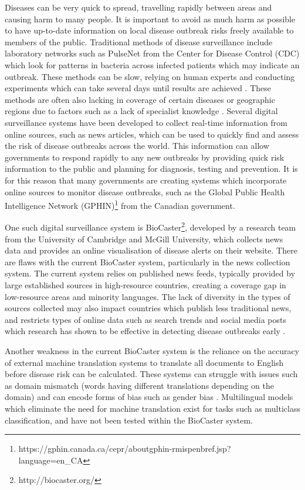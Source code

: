 \documentclass{l4proj}
\begin{document}
Diseases can be very quick to spread, travelling rapidly between areas and causing harm to many people. It is important to avoid as much harm as possible to have up-to-date information on local disease outbreak risks freely available to members of the public. Traditional methods of disease surveillance include laboratory networks such as PulseNet from the Center for Disease Control (CDC) which look for patterns in bacteria across infected patients which may indicate an outbreak. These methods can be slow, relying on human experts and conducting experiments which can take several days until results are achieved \citep{swaminathan2001pulsenet}. These methods are often also lacking in coverage of certain diseases or geographic regions due to factors such as a lack of specialist knowledge \citep{abdulraheem2004disease}. Several digital surveillance systems have been developed to collect real-time information from online sources, such as news articles, which can be used to quickly find and assess the risk of disease outbreaks across the world. This information can allow governments to respond rapidly to any new outbreaks by providing quick risk information to the public and planning for diagnosis, testing and prevention. It is for this reason that many governments are creating systems which incorporate online sources to monitor disease outbreaks, such as the Global Public Health Intelligence Network (GPHIN)\footnote{https://gphin.canada.ca/cepr/aboutgphin-rmispenbref.jsp?language=en_CA} from the Canadian government. \par

One such digital surveillance system is BioCaster\footnote{http://biocaster.org/}, developed by a research team from the University of Cambridge and McGill University, which collects news data and provides an online visualisation of disease alerts on their website. There are flaws with the current BioCaster system, particularly in the news collection system. The current system relies on published news feeds, typically provided by large established sources in high-resource countries, creating a coverage gap in low-resource areas and minority languages. The lack of diversity in the types of sources collected may also impact countries which publish less traditional news, and restricts types of online data such as search trends and social media posts which research has shown to be effective in detecting disease outbreaks early \cite{seo2017methods}. \par
Another weakness in the current BioCaster system is the reliance on the accuracy of external machine translation systems to translate all documents to English before disease risk can be calculated. These systems can struggle with issues such as domain mismatch (words having different translations depending on the domain) \citep{koehn2017six} and can encode forms of bias such as gender bias \citep{stanovsky2019evaluating}. Multilingual models which eliminate the need for machine translation exist for tasks such as multiclass classification, and have not been tested within the BioCaster system.
\end{document}
